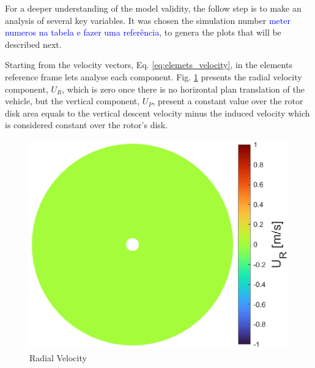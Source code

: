{For a deeper understanding of the model validity, the follow step is to make an analysis of several key variables. It was chosen the simulation number \textcolor{blue}{meter numeros na tabela e fazer uma referência}, to genera the plots that will be described next.

Starting from the velocity vectors, Eq. \ref{eq:elemets_velocity}, in the elements reference frame lets analyse each component. Fig. \ref{fig:paper_radial_velocity} presents the radial velocity component, $U_R$, which is zero once there is no horizontal plan translation of the vehicle, but the vertical component, $U_P$, present a constant value over the rotor disk area equals to the vertical descent velocity minus the induced velocity which is considered constant over the rotor's disk. 

\begin{figure}[!htb]
    \centering
    \begin{minipage}{.49\textwidth}
      \centering
      \includegraphics[width=\textwidth]{Figures/comp_method/sim_B/U_R.eps}
      \caption[Radial Velocity]{Radial Velocity}
      \label{fig:paper_radial_velocity}
    \end{minipage}%
    \begin{minipage}{.01\textwidth}
         \hfill
    \end{minipage}
    \begin{minipage}{.49\textwidth}
      \centering

\end{minipage}
\end{figure}}
